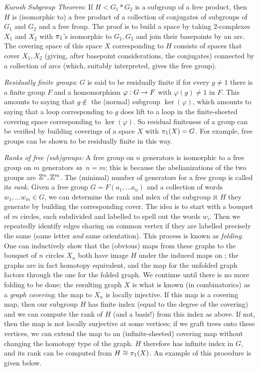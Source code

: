 \msk

{\it Kurosh Subgroup Theorem}: If $H < G_1*G_2$ is a subgroup of
a free product, then $H$ is (isomorphic to) a free product of a
collection of conjugates of subgroups of $G_1$ and $G_2$ and a 
free froup. The proof is to build a space by taking 2-complexes
$X_1$ and $X_2$ with $\pi_1$'s isomorphic to $G_1,G_2$ and join
their basepoints by an arc. The covering space of this space $X$
corresponding to $H$ consists of spaces that cover $X_1,X_2$
(giving, after basepoint considerations, the conjugates)
connected by a collection of arcs (which, suitably interpreted,
gives the free group).

\msk

{\it Residually finite groups}: $G$ is said to be residually finite if for every $g\neq 1$ there is a 
finite group $F$ and a homomorphism $\varphi: G\rightarrow F$ with $\varphi(g)\neq 1$ in $F$. This 
amounts to saying that $g\notin$ the (normal) subgroup $\ker(\varphi)$, which amounts to
saying that a loop corresponding to $g$ does  lift to a loop in the finite-sheeted
covering space corresponding to $\ker(\varphi)$. So residual finiteness of a group can be
verified by building coverings of a space $X$ with $\pi_1(X)=G$. For example, free groups can be
shown to be residually finite in this way. 

\msk

{\it Ranks of free (sub)groups:} A free group on $n$
generators is isomorphic to a free group on $m$ generators
$\Leftrightarrow$ $n=m$; this is because the abelianizations of the two 
groups are ${\Bbb Z}^n,{\Bbb Z}^m$. The (minimal) number of 
generators for a free group is called its {\it rank}.
Given a free group
$G=F(a_1,\ldots a_n)$ and a collection of words $w_1,\ldots w_m\in G$,
we can determine the rank and ndex of the subgroup it $H$ they
generate by building the corresponding cover. The idea is
to start with a bouquet of $m$ circles, each subdivided 
and labelled to spell
out the words $w_i$. Then we repeatedly identify edges sharing
on common vertex if they are labelled precisely the same (same
letter {\it and} same orientation). This process is known
as {\it folding}. One can inductively show that the (obvious)
maps from these graphs to the bouquet of $n$ circles $X_n$ both
have image $H$ under the induced maps on \mpu ; the graphs
are in fact homotopy equivalent, and the map for the unfolded graph
factors through the one for the folded graph. We continue until there
is no more folding to be done; the resulting graph $X$ is what is 
known (in combinatorics) as a {\it graph covering}; the map to $X_n$
is locally injective. If this map is a covering map, then our subgroup
$H$ has finite index (equal to the degree of the
covering) and we can compute the rank of $H$ (and a basis!) from this
index as above. If not, then the map is not locally surjective at
some vertices; if we graft trees onto these vertices, we can extend the map
to an (infinite-sheeted) covering map without changing the homotopy
type of the graph. $H$ therefore has infinite index in $G$, and its
rank can be computed from $H\cong \pi_1(X)$. An example of this procedure
is given below.

